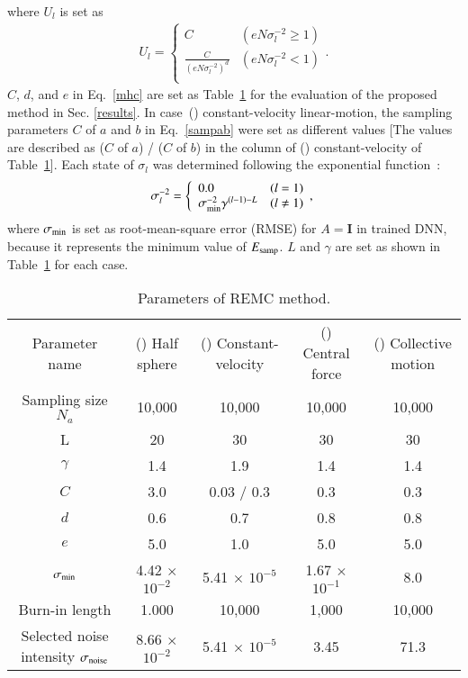 \documentclass[preprint,
bibnotes,
 amsmath,amssymb,
 aps,
]{revtex4-1}
\newcounter{num}
\newcommand{\rnum}[1]{\setcounter{num}{#1}\roman{num}}
\begin{document}
where $U_l$ is set as
\begin{eqnarray}
\label{mhc}
U_l = \left\{ \begin{array}{ll}
C & (eN\sigma_l^{-2}\geq 1) \\
\frac{C}{(eN\sigma_l^{-2})^{d}} & (eN\sigma_l^{-2} < 1) \\
\end{array}. \right.
\end{eqnarray}
$C$, $d$, and $e$ in Eq.~\eqref{mhc} are set as Table~\ref{tbl2} for the evaluation of the proposed method in Sec. \ref{results}. In case~(\rnum{2}) constant-velocity linear-motion, the sampling parameters $C$ of $a$ and $b$ in Eq.~\eqref{sampab} were set as different values [The values are described as ($C$ of $a$) / ($C$ of $b$) in the column of (\rnum{2}) constant-velocity of Table~\ref{tbl2}].  
Each state of $\sigma_l$ was determined following the exponential function~\cite{nagata2008asymptotic}:
\begin{eqnarray}
\sigma_l^{-2} = \left\{ \begin{array}{ll}
0.0 & (l=1) \\
\sigma_{\rm min}^{-2} \gamma^{(l-1)-L} & (l\neq1) \\
\end{array} ,\right.
\end{eqnarray}
where $\sigma_{\rm min}$ is set as root-mean-square error (RMSE) for $A = \boldsymbol{I}$ in trained DNN, because it represents the minimum value of $E_{\rm samp}$. 
$L$ and $\gamma$ are set as shown in Table~\ref{tbl2} for each case. 

\begin{table}[t]\caption{\label{tbl2}Parameters of REMC method.
}
\begin{ruledtabular}
\begin{tabular}{c|cccc}
\textrm{Parameter name}&
\textrm{(\rnum{1}) Half sphere}&
\textrm{(\rnum{2}) Constant-velocity}&
\textrm{(\rnum{3}) Central force}&
\textrm{(\rnum{4}) Collective motion}\\
\colrule
Sampling size $N_a$ & 10,000 & 10,000 & 10,000 & 10,000\\
L & 20 & 30 & 30 & 30\\
$\gamma$ & 1.4 & 1.9 & 1.4 & 1.4\\
$C$ & 3.0 & 0.03 / 0.3 & 0.3 & 0.3\\
$d$ & 0.6 & 0.7 & 0.8 & 0.8\\
$e$ & 5.0 & 1.0 & 5.0 & 5.0\\
$\sigma_{\rm min}$ & 4.42 $\times$ $10^{-2}$ & 5.41 $\times$ $10^{-5}$ & 1.67 $\times$ $10^{-1}$ & 8.0\\
Burn-in length & 1.000 & 10,000 & 1,000 & 10,000\\
Selected noise intensity $\sigma_{\rm noise}$ & 8.66 $\times$ $10^{-2}$ & 5.41 $\times$ $10^{-5}$ & 3.45 & 71.3\\
\end{tabular}
\end{ruledtabular}
\end{table}
\end{document}
